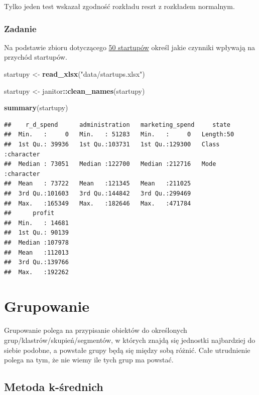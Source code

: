 \documentclass[]{book}
\newenvironment{Shaded}{\begin{snugshade}}{\end{snugshade}}
\newcommand{\KeywordTok}[1]{\textcolor[rgb]{0.13,0.29,0.53}{\textbf{#1}}}
\newcommand{\NormalTok}[1]{#1}
\newcommand{\OperatorTok}[1]{\textcolor[rgb]{0.81,0.36,0.00}{\textbf{#1}}}
\newcommand{\StringTok}[1]{\textcolor[rgb]{0.31,0.60,0.02}{#1}}
\begin{document}
Tylko jeden test wskazał zgodność rozkładu reszt z rozkładem normalnym.

\hypertarget{zadanie-1}{%
\subsection{Zadanie}\label{zadanie-1}}

Na podstawie zbioru dotyczącego \href{data/50_Startups.csv}{50 startupów} określ jakie czynniki wpływają na przychód startupów.

\begin{Shaded}
\begin{Highlighting}[]
\NormalTok{startupy <-}\StringTok{ }\KeywordTok{read_xlsx}\NormalTok{(}\StringTok{"data/startups.xlsx"}\NormalTok{)}

\NormalTok{startupy <-}\StringTok{ }\NormalTok{janitor}\OperatorTok{::}\KeywordTok{clean_names}\NormalTok{(startupy)}

\KeywordTok{summary}\NormalTok{(startupy)}
\end{Highlighting}
\end{Shaded}

\begin{verbatim}
##    r_d_spend      administration   marketing_spend     state          
##  Min.   :     0   Min.   : 51283   Min.   :     0   Length:50         
##  1st Qu.: 39936   1st Qu.:103731   1st Qu.:129300   Class :character  
##  Median : 73051   Median :122700   Median :212716   Mode  :character  
##  Mean   : 73722   Mean   :121345   Mean   :211025                     
##  3rd Qu.:101603   3rd Qu.:144842   3rd Qu.:299469                     
##  Max.   :165349   Max.   :182646   Max.   :471784                     
##      profit      
##  Min.   : 14681  
##  1st Qu.: 90139  
##  Median :107978  
##  Mean   :112013  
##  3rd Qu.:139766  
##  Max.   :192262
\end{verbatim}

\hypertarget{grupowanie}{%
\chapter{Grupowanie}\label{grupowanie}}

Grupowanie polega na przypisanie obiektów do określonych grup/klastrów/skupień/segmentów, w których znajdą się jednostki najbardziej do siebie podobne, a powstałe grupy będą się między sobą różnić. Całe utrudnienie polega na tym, że nie wiemy ile tych grup ma powstać.

\hypertarget{metoda-k-srednich}{%
\section{Metoda k-średnich}\label{metoda-k-srednich}}
\end{document}
